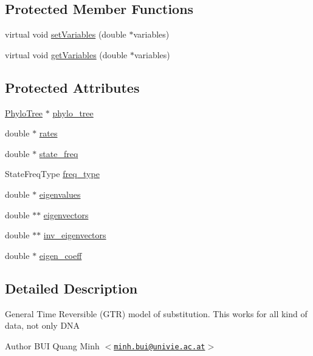 \subsection*{Protected Member Functions}
\begin{DoxyCompactItemize}
\item 
virtual void \hyperlink{classGTRModel_a1231f10a523ef280e1862b18b0549aa6}{setVariables} (double $\ast$variables)
\item 
virtual void \hyperlink{classGTRModel_ae0d291e293dd142d41466650539a2481}{getVariables} (double $\ast$variables)
\end{DoxyCompactItemize}
\subsection*{Protected Attributes}
\begin{DoxyCompactItemize}
\item 
\hyperlink{classPhyloTree}{PhyloTree} $\ast$ \hyperlink{classGTRModel_a21785f014f182f075d608cfc9118e6fb}{phylo\_\-tree}
\item 
double $\ast$ \hyperlink{classGTRModel_ad194dff1b132c09e4c2ebff0f8cdedab}{rates}
\item 
double $\ast$ \hyperlink{classGTRModel_a03c2ca5094d8c6563dbded5a05b26319}{state\_\-freq}
\item 
StateFreqType \hyperlink{classGTRModel_a699318690979ff66c655dd3022d5127a}{freq\_\-type}
\item 
double $\ast$ \hyperlink{classGTRModel_a162f4d6889a320c2753ea31d6c0b03f1}{eigenvalues}
\item 
double $\ast$$\ast$ \hyperlink{classGTRModel_ab8e201929a6d84d9bd2e58d0a3e03b5b}{eigenvectors}
\item 
double $\ast$$\ast$ \hyperlink{classGTRModel_a74c9c92fe909714d09f75fdcb8459ac9}{inv\_\-eigenvectors}
\item 
double $\ast$ \hyperlink{classGTRModel_a79645d7740f239a3a101c0b58fcb236c}{eigen\_\-coeff}
\end{DoxyCompactItemize}


\subsection{Detailed Description}
General Time Reversible (GTR) model of substitution. This works for all kind of data, not only DNA

\begin{DoxyAuthor}{Author}
BUI Quang Minh $<$\href{mailto:minh.bui@univie.ac.at}{\tt minh.bui@univie.ac.at}$>$ 
\end{DoxyAuthor}


